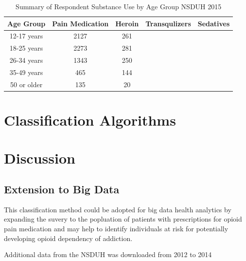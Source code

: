 \documentclass[sigconf]{acmart}
\begin{document}

\begin{table}
  \caption{Summary of Respondent Substance Use by Age Group NSDUH 2015}
  \label{tab:freq}
  \begin{tabular}{ccccc}
    \toprule
     Age Group & Pain Medication& Heroin& Transqulizers& Sedatives \\
    \midrule
    12-17 years& 2127& 261&  &  &   \\
    18-25 years& 2273& 281&  &  &   \\
    26-34 years& 1343& 250&  &  &   \\
    35-49 years&  465& 144&  &  &   \\
    50 or older&  135&  20&  &  &   \\
    \bottomrule
  \end{tabular}
\end{table}







\section{Classification Algorithms}

\cite{muller17}


\cite{raschka17}




\cite{vanderplas17}


\section{Discussion}

\subsection{Extension to Big Data}

This classification method could be adopted for big data health analytics by
expanding the suvery to the popluation of patients with prescriptions for 
opioid pain medication and may help to identify individuals at risk for
potentially developing opioid dependency of addiction. 


Additional data from the NSDUH was downloaded from 2012 to 2014
\end{document}
